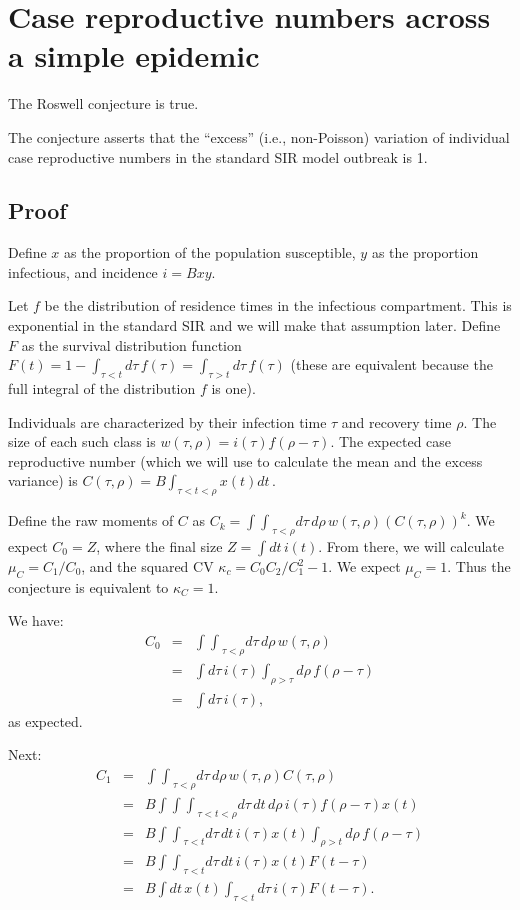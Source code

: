 \documentclass[12pt]{article}
\newcommand{\dt}{dt\,}
\newcommand{\dtau}{d\tau\,}
\newcommand{\drho}{d\rho\,}
\newcommand{\intint}{{\int\!\!\int}}
\newcommand{\intintint}{{\int\!\!\int\!\!\int}}
\newcommand{\eqlab}[1]{\label{eq:#1}}
\begin{document}
\section*{Case reproductive numbers across a simple epidemic}

The Roswell conjecture is true.

The conjecture asserts that the “excess” (i.e., non-Poisson) variation of individual case reproductive numbers in the standard SIR model outbreak is 1.

\subsection*{Proof}
Define $x$ as the proportion of the population susceptible, $y$ as the proportion infectious, and incidence $i = Bxy$.

Let $f$ be the distribution of residence times in the infectious compartment. This is exponential in the standard SIR and we will make that assumption later. Define $F$ as the survival distribution function 
$F(t) 
	= 1 -\int_{\tau<t} \dtau f(\tau)
	= \int_{\tau>t} \dtau f(\tau)
$ (these are equivalent because the full integral of the distribution $f$ is one).

Individuals are characterized by their infection time $\tau$ and recovery time $\rho$. The size of each such class is $w(\tau, \rho) = i(\tau) f(\rho-\tau)$. The expected case reproductive number (which we will use to calculate the mean and the excess variance) is $C(\tau, \rho) = B \int_{\tau<t<\rho} x(t) \dt$.

Define the raw moments of $C$ as $C_k = \intint_{\tau<\rho} \dtau\drho w(\tau, \rho) (C(\tau, \rho))^k$. 
We expect $C_0=Z$, where the final size $Z = \int\dt i(t)$. From there, we will calculate $\mu_C = C_1/C_0$, and the squared CV $\kappa_c = C_0C_2/C_1^2-1$. We expect $\mu_C=1$. Thus the conjecture is equivalent to $\kappa_C = 1$.

We have:
\begin{eqnarray}
	C_0
	&=& \intint_{\tau<\rho} \dtau\drho w(\tau, \rho) 
	\\ &=& \int \dtau i(\tau) \int_{\rho>\tau} \drho f(\rho-\tau)
	\\ &=& \int \dtau i(\tau), 
\end{eqnarray}
as expected.

Next:
\begin{eqnarray}
	C_1
	&=& \intint_{\tau<\rho} \dtau\drho w(\tau, \rho) C(\tau, \rho)
	\\ &=& B \intintint_{\tau<t<\rho} \dtau\dt\drho 
		i(\tau) f(\rho-\tau) x(t)
	\\ &=& B \intint_{\tau<t} \dtau\dt i(\tau) x(t)
		\int_{\rho>t} \drho f(\rho-\tau) 
	\\ &=& B \intint_{\tau<t} \dtau\dt i(\tau) x(t) F(t-\tau)
	\\ &=& B \int \dt x(t) \int_{\tau<t}\dtau i(\tau) F(t-\tau).
	\eqlab{C1pre}
\end{eqnarray}
\end{document}
